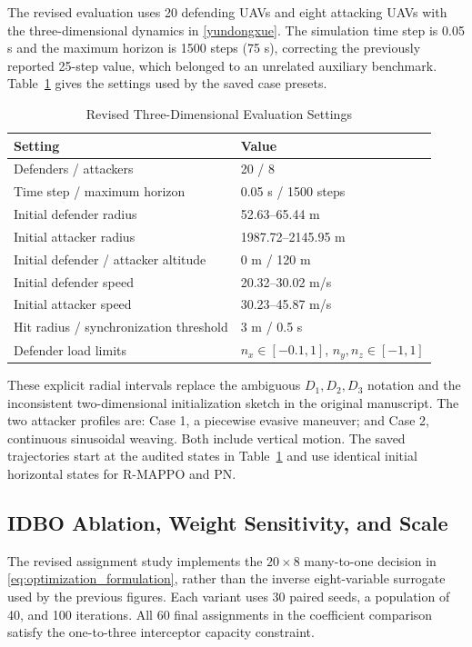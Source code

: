 \documentclass[lettersize,journal]{IEEEtran}
\begin{document}
The revised evaluation uses 20 defending UAVs and eight attacking UAVs with the
three-dimensional dynamics in \eqref{yundongxue}. The simulation time step is
0.05 s and the maximum horizon is 1500 steps (75 s), correcting the previously
reported 25-step value, which belonged to an unrelated auxiliary benchmark.
Table~\ref{tab:revised_setup} gives the settings used by the saved case presets.

\begin{table}[!t]
\centering
\caption{Revised Three-Dimensional Evaluation Settings}
\label{tab:revised_setup}
\footnotesize
\renewcommand{\arraystretch}{1.12}
\begin{tabular}{p{}p{}}
\toprule
Setting & Value \\
\midrule
Defenders / attackers & 20 / 8 \\
Time step / maximum horizon & 0.05 s / 1500 steps \\
Initial defender radius & 52.63--65.44 m \\
Initial attacker radius & 1987.72--2145.95 m \\
Initial defender / attacker altitude & 0 m / 120 m \\
Initial defender speed & 20.32--30.02 m/s \\
Initial attacker speed & 30.23--45.87 m/s \\
Hit radius / synchronization threshold & 3 m / 0.5 s \\
Defender load limits & \(n_x\in[-0.1,1]\), \(n_y,n_z\in[-1,1]\) \\
\bottomrule
\end{tabular}
\end{table}

These explicit radial intervals replace the ambiguous \(D_1,D_2,D_3\) notation
and the inconsistent two-dimensional initialization sketch in the original
manuscript. The two attacker profiles are: Case 1, a piecewise evasive maneuver;
and Case 2, continuous sinusoidal weaving. Both include vertical motion. The
saved trajectories start at the audited states in Table~\ref{tab:revised_setup}
and use identical initial horizontal states for R-MAPPO and PN.

\subsection{IDBO Ablation, Weight Sensitivity, and Scale}
\label{subsec:idbo_results}

The revised assignment study implements the \(20\times8\) many-to-one decision
in \eqref{eq:optimization_formulation}, rather than the inverse eight-variable
surrogate used by the previous figures. Each variant uses 30 paired seeds, a
population of 40, and 100 iterations. All 60 final assignments in the coefficient
comparison satisfy the one-to-three interceptor capacity constraint.
\end{document}
